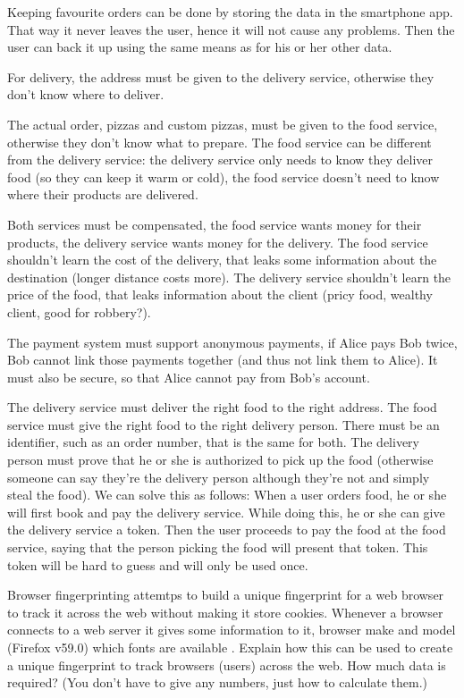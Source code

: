 \begin{solution}
  Keeping favourite orders \etc can be done by storing the data in the 
  smartphone app.
  That way it never leaves the user, hence it will not cause any problems.
  Then the user can back it up using the same means as for his or her other 
  data.

  For delivery, the address must be given to the delivery service, otherwise 
  they don't know where to deliver.

  The actual order, \eg pizzas and custom pizzas, must be given to the food 
  service, otherwise they don't know what to prepare.
  The food service can be different from the delivery service: the delivery 
  service only needs to know they deliver food (so they can keep it warm or 
  cold), the food service doesn't need to know where their products are 
  delivered.

  Both services must be compensated, the food service wants money for their 
  products, the delivery service wants money for the delivery.
  The food service shouldn't learn the cost of the delivery, that leaks some 
  information about the destination (\eg longer distance costs more).
  The delivery service shouldn't learn the price of the food, that leaks 
  information about the client (pricy food, wealthy client, good for robbery?).

  The payment system must support anonymous payments, \ie if Alice pays Bob 
  twice, Bob cannot link those payments together (and thus not link them to 
  Alice).
  It must also be secure, so that Alice cannot pay from Bob's account.

  The delivery service must deliver the right food to the right address.
  The food service must give the right food to the right delivery person.
  There must be an identifier, such as an order number, that is the same for 
  both.
  The delivery person must prove that he or she is authorized to pick up the 
  food (otherwise someone can say they're the delivery person although they're 
  not and simply steal the food).
  We can solve this as follows:
  When a user orders food, he or she will first book and pay the delivery 
  service.
  While doing this, he or she can give the delivery service a token.
  Then the user proceeds to pay the food at the food service, saying that the 
  person picking the food will present that token.
  This token will be hard to guess and will only be used once.
\end{solution}

\question[3]
Browser fingerprinting attemtps to build a unique fingerprint for a web browser 
to track it across the web without making it store cookies.
Whenever a browser connects to a web server it gives some information to it, 
\eg browser make and model (\eg Firefox v59.0) which fonts are available \etc.
Explain how this can be used to create a unique fingerprint to track browsers 
(\ie users) across the web.
How much data is required?
(You don't have to give any numbers, just how to calculate them.)

